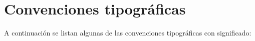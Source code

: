 \section{Convenciones tipográficas}

A continuación se listan algunas de las convenciones tipográficas con
significado:

% 
% 
% 
% 
% 
% 
% 
% 
% 
% 
% 
% 
% 
% 
% 
